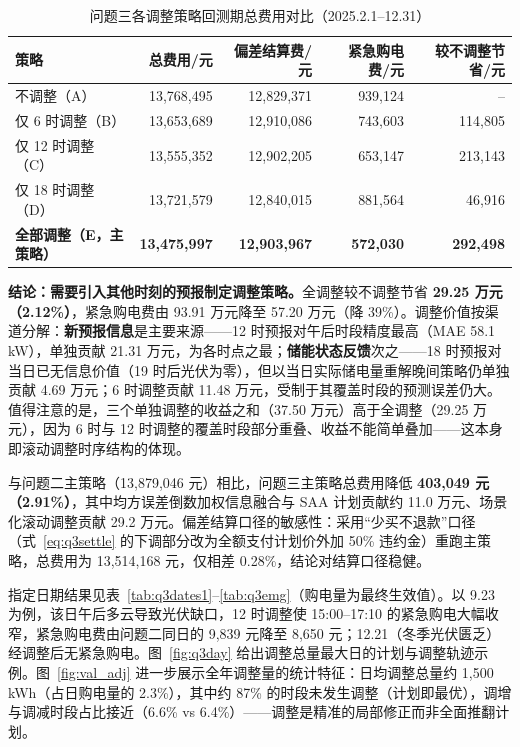 \documentclass[zihao=-4,a4paper,UTF8,fontset=none]{ctexart}
\begin{document}
\begin{table}[H]
  \centering
  \caption{问题三各调整策略回测期总费用对比（2025.2.1--12.31）}
  \label{tab:q3cmp}
  \begin{tabularx}{0.94\textwidth}{L R R R R}
    \toprule
    策略 & 总费用/元 & 偏差结算费/元 & 紧急购电费/元 & 较不调整节省/元 \\
    \midrule
    不调整（A） & 13,768,495 & 12,829,371 & 939,124 & -- \\
    仅 6 时调整（B） & 13,653,689 & 12,910,086 & 743,603 & 114,805 \\
    仅 12 时调整（C） & 13,555,352 & 12,902,205 & 653,147 & 213,143 \\
    仅 18 时调整（D） & 13,721,579 & 12,840,015 & 881,564 & 46,916 \\
    \textbf{全部调整（E，主策略）} & \textbf{13,475,997} & \textbf{12,903,967} & \textbf{572,030} & \textbf{292,498} \\
    \bottomrule
  \end{tabularx}
\end{table}

\textbf{结论：需要引入其他时刻的预报制定调整策略。}全调整较不调整节省 \textbf{29.25 万元（2.12\%）}，紧急购电费由 93.91 万元降至 57.20 万元（降 39\%）。调整价值按渠道分解：\textbf{新预报信息}是主要来源——12 时预报对午后时段精度最高（MAE 58.1 kW），单独贡献 21.31 万元，为各时点之最；\textbf{储能状态反馈}次之——18 时预报对当日已无信息价值（19 时后光伏为零），但以当日实际储电量重解晚间策略仍单独贡献 4.69 万元；6 时调整贡献 11.48 万元，受制于其覆盖时段的预测误差仍大。值得注意的是，三个单独调整的收益之和（37.50 万元）高于全调整（29.25 万元），因为 6 时与 12 时调整的覆盖时段部分重叠、收益不能简单叠加——这本身即滚动调整时序结构的体现。

与问题二主策略（13,879,046 元）相比，问题三主策略总费用降低 \textbf{403,049 元（2.91\%）}，其中均方误差倒数加权信息融合与 SAA 计划贡献约 11.0 万元、场景化滚动调整贡献 29.2 万元。偏差结算口径的敏感性：采用``少买不退款''口径（式~\eqref{eq:q3settle} 的下调部分改为全额支付计划价外加 50\% 违约金）重跑主策略，总费用为 13,514,168 元，仅相差 0.28\%，结论对结算口径稳健。

指定日期结果见表~\ref{tab:q3dates1}--\ref{tab:q3emg}（购电量为最终生效值）。以 9.23 为例，该日午后多云导致光伏缺口，12 时调整使 15:00--17:10 的紧急购电大幅收窄，紧急购电费由问题二同日的 9,839 元降至 8,650 元；12.21（冬季光伏匮乏）经调整后无紧急购电。图~\ref{fig:q3day} 给出调整总量最大日的计划与调整轨迹示例。图~\ref{fig:val_adj} 进一步展示全年调整量的统计特征：日均调整总量约 1,500 kWh（占日购电量的 2.3\%），其中约 87\% 的时段未发生调整（计划即最优），调增与调减时段占比接近（6.6\% vs 6.4\%）——调整是精准的局部修正而非全面推翻计划。
\end{document}
